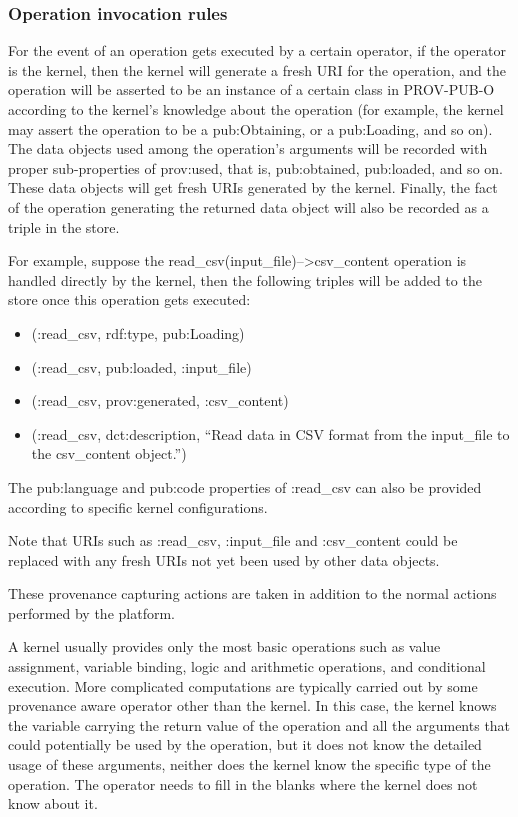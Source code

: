 \subsubsection{Operation invocation rules}
For the event of an operation gets executed by a certain operator, if the operator is the kernel, then the kernel will generate a fresh URI for the operation, and the operation will be asserted to be an instance of a certain class in PROV-PUB-O according to the kernel's knowledge about the operation (for example, the kernel may assert the operation to be a pub:Obtaining, or a pub:Loading, and so on). The data objects used among the operation's arguments will be recorded with proper sub-properties of prov:used, that is, pub:obtained, pub:loaded, and so on. These data objects will get fresh URIs generated by the kernel. Finally, the fact of the operation generating the returned data object will also be recorded as a triple in the store.

For example, suppose the read\_csv(input\_file)-->csv\_content operation is handled directly by the kernel, then the following triples will be added to the store once this operation gets executed:
\begin{itemize}
	\item (:read\_csv, rdf:type, pub:Loading)
	\item (:read\_csv, pub:loaded, :input\_file)
	\item (:read\_csv, prov:generated, :csv\_content)
	\item (:read\_csv, dct:description, ``Read data in CSV format from the input\_file to the csv\_content object.'')
\end{itemize}
The pub:language and pub:code properties of :read\_csv can also be provided according to specific kernel configurations.

Note that URIs such as :read\_csv, :input\_file and :csv\_content could be replaced with any fresh URIs not yet been used by other data objects.

These provenance capturing actions are taken in addition to the normal actions performed by the platform.

A kernel usually provides only the most basic operations such as value assignment, variable binding, logic and arithmetic operations, and conditional execution. More complicated computations are typically carried out by some provenance aware operator other than the kernel. In this case, the kernel knows the variable carrying the return value of the operation and all the arguments that could potentially be used by the operation, but it does not know the detailed usage of these arguments, neither does the kernel know the specific type of the operation. The operator needs to fill in the blanks where the kernel does not know about it.

